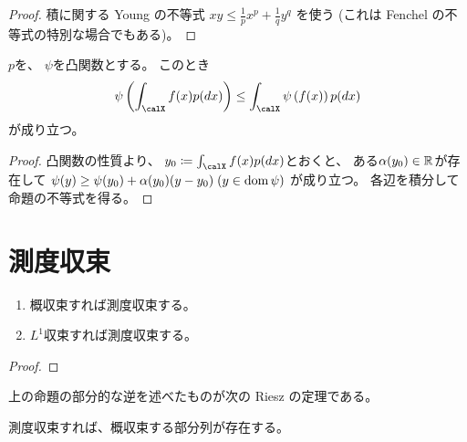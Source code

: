 \documentclass[report]{jlreq}
\begin{document}
\begin{proof}
    積に関する Young の不等式
    $xy \le \frac{1}{p} x^p + \frac{1}{q} y^q$
    を使う (これは Fenchel の不等式の特別な場合でもある)。
\end{proof}

\begin{proposition}
    $p$を、
    $\psi$を凸関数とする。
    このとき
    \begin{equation}
        \psi\myparen{
            \int_\calX f(x) p(dx)
        }
            \le
                \int_\calX \psi\myparen{
                    f(x)
                } p(dx)
    \end{equation}
    が成り立つ。
\end{proposition}

\begin{proof}
    凸関数の性質より、
    $y_0 \coloneqq \int_\calX f(x) p(dx)$とおくと、
    ある$\alpha(y_0) \in \mathbb{R}$が存在して
    $\psi(y) \ge \psi(y_0) + \alpha(y_0) (y - y_0) \; (y \in \operatorname{dom}\psi)$
    が成り立つ。
    各辺を積分して命題の不等式を得る。
\end{proof}

%
\section{測度収束}


\begin{definition}
    \TODO{}
\end{definition}

\begin{proposition}
    \begin{enumerate}
        \item 概収束すれば測度収束する。
        \item $L^1$収束すれば測度収束する。
    \end{enumerate}
\end{proposition}

\begin{proof}
    \TODO{}
\end{proof}

上の命題の部分的な逆を述べたものが次の Riesz の定理である。

\begin{theorem}[Riesz]
    測度収束すれば、概収束する部分列が存在する。
\end{theorem}
\end{document}
